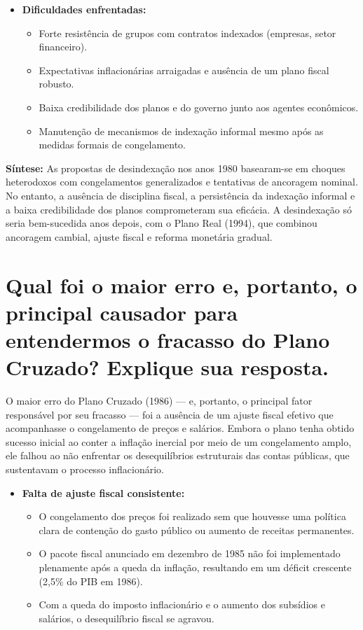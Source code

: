 \documentclass{sciposter}
\begin{document}
\begin{multicols}{3}
\begin{itemize}
    \item \textbf{ Dificuldades enfrentadas:}
    \begin{itemize}
        \item Forte resistência de grupos com contratos indexados (empresas, setor financeiro).
        \item Expectativas inflacionárias arraigadas e ausência de um plano fiscal robusto.
        \item Baixa credibilidade dos planos e do governo junto aos agentes econômicos.
        \item Manutenção de mecanismos de indexação informal mesmo após as medidas formais de congelamento.
    \end{itemize}
\end{itemize}

\textbf{Síntese:} As propostas de desindexação nos anos 1980 basearam-se em choques heterodoxos com congelamentos generalizados e tentativas de ancoragem nominal. No entanto, a ausência de disciplina fiscal, a persistência da indexação informal e a baixa credibilidade dos planos comprometeram sua eficácia. A desindexação só seria bem-sucedida anos depois, com o Plano Real (1994), que combinou ancoragem cambial, ajuste fiscal e reforma monetária gradual.

\section{\textbf{Qual foi o maior erro e, portanto, o principal causador para entendermos o fracasso do Plano Cruzado? Explique sua resposta.}}

O maior erro do Plano Cruzado (1986) — e, portanto, o principal fator responsável por seu fracasso — foi a ausência de um ajuste fiscal efetivo que acompanhasse o congelamento de preços e salários. Embora o plano tenha obtido sucesso inicial ao conter a inflação inercial por meio de um congelamento amplo, ele falhou ao não enfrentar os desequilíbrios estruturais das contas públicas, que sustentavam o processo inflacionário.

\begin{itemize}
    \item \textbf{ Falta de ajuste fiscal consistente:}
    \begin{itemize}
        \item O congelamento dos preços foi realizado sem que houvesse uma política clara de contenção do gasto público ou aumento de receitas permanentes.
        \item O pacote fiscal anunciado em dezembro de 1985 não foi implementado plenamente após a queda da inflação, resultando em um déficit crescente (2,5\% do PIB em 1986).
        \item Com a queda do imposto inflacionário e o aumento dos subsídios e salários, o desequilíbrio fiscal se agravou.
    \end{itemize}


\end{itemize}
\end{multicols}
\end{document}
